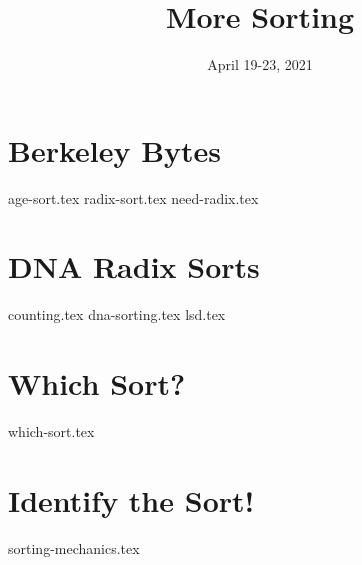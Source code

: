 \documentclass[11pt]{exam}
\title{More Sorting}
\date{April 19-23, 2021}
\begin{document}
\maketitle 
\section{Berkeley Bytes}
\begin{questions}
{age-sort.tex}
{radix-sort.tex}
{need-radix.tex}

\end{questions}
\newpage
\section{DNA Radix Sorts}
\begin{questions}
{counting.tex}
{dna-sorting.tex}
{lsd.tex}

\end{questions}

\pagebreak

\section{Which Sort?} 
\begin{questions}
{which-sort.tex}
\end{questions}
\pagebreak

\section{Identify the Sort!} 
\begin{questions}
{sorting-mechanics.tex}
\end{questions}

\pagebreak
\end{document}
